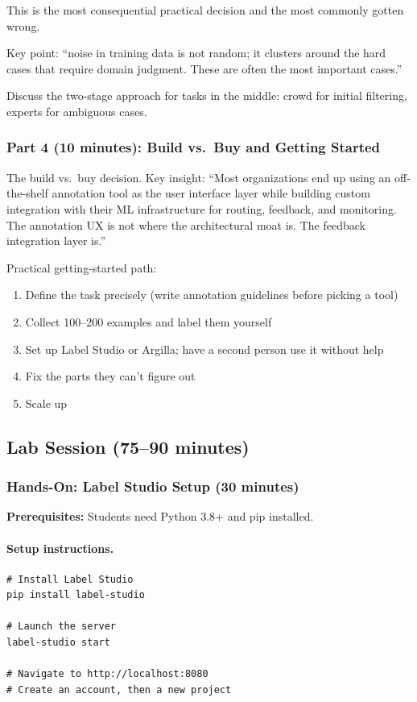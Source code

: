 This is the most consequential practical decision and the most commonly gotten wrong.

Key point: ``noise in training data is not random; it clusters around the hard cases that require domain judgment. These are often the most important cases.''

Discuss the two-stage approach for tasks in the middle: crowd for initial filtering, experts for ambiguous cases.

\subsubsection{Part 4 (10 minutes): Build vs.\ Buy and Getting Started}

The build vs.\ buy decision. Key insight: ``Most organizations end up using an off-the-shelf annotation tool as the user interface layer while building custom integration with their ML infrastructure for routing, feedback, and monitoring. The annotation UX is not where the architectural moat is. The feedback integration layer is.''

Practical getting-started path:
\begin{enumerate}
    \item Define the task precisely (write annotation guidelines before picking a tool)
    \item Collect 100--200 examples and label them yourself
    \item Set up Label Studio or Argilla; have a second person use it without help
    \item Fix the parts they can't figure out
    \item Scale up
\end{enumerate}

\subsection{Lab Session (75--90 minutes)}

\subsubsection{Hands-On: Label Studio Setup (30 minutes)}

\textbf{Prerequisites:} Students need Python 3.8+ and pip installed.

\paragraph{Setup instructions.}
\begin{lstlisting}[style=python, caption={Label Studio quickstart}, label={lst:label-studio-setup}]
# Install Label Studio
pip install label-studio

# Launch the server
label-studio start

# Navigate to http://localhost:8080
# Create an account, then a new project
\end{lstlisting}


